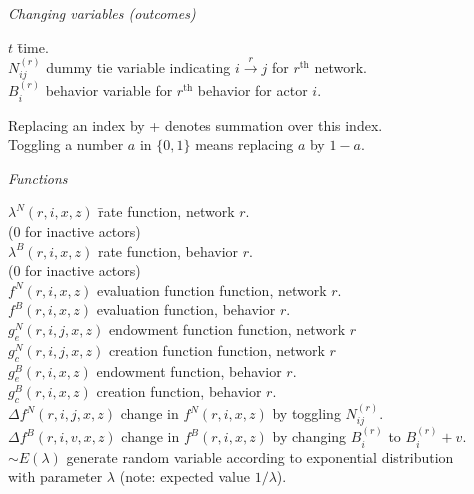 \documentclass[a4paper,12pt,fleqn]{article}
\begin{document}
\emph{Changing variables (outcomes)}

\begin{tabbing}
$t$ \hspace*{3em} \= time.\\[1ex]
$N^{(r)}_{ij}$ \> dummy tie variable indicating $ i \stackrel{r}{\rightarrow} j $ for $r^{\text{th}}$ network.\\[1ex]
$B^{(r)}_{i}$ \> behavior variable for $r^{\text{th}}$ behavior for actor $i$.
\end{tabbing}
\medskip

Replacing an index by + denotes summation over this index.\\
Toggling a number $a$ in $\{0, 1\}$ means replacing $a$ by $1-a$.
\medskip
\fi

\emph{Functions}

\begin{tabbing}
$\lambda^N(r,i,x,z)$ \hspace*{3em} \= rate function, network $r$.\\
                                  \> (0 for inactive actors)\\[1ex]
$\lambda^B(r,i,x,z)$ \hspace*{3em} \> rate function, behavior $r$.\\
                                  \> (0 for inactive actors)\\[1ex]
$f^N(r,i,x,z)$ \hspace*{3em} \> evaluation function function, network $r$.\\[1ex]
$f^B(r,i,x,z)$ \hspace*{3em} \> evaluation function, behavior $r$.\\[1ex]
$g_e^N(r,i,j,x,z)$ \hspace*{3em} \> endowment function function, network $r$\\[1ex]
$g_c^N(r,i,j,x,z)$ \hspace*{3em} \> creation function function, network $r$\\[1ex]
$g_e^B(r,i,x,z)$ \hspace*{3em} \> endowment function, behavior $r$.\\[1ex]
$g_c^B(r,i,x,z)$ \hspace*{3em} \> creation function, behavior $r$.\\[1ex]
$\Delta f^N(r,i,j,x,z)$ \hspace*{3em} \> change in $f^N(r,i,x,z)$
                                by toggling $N^{(r)}_{ij}$.\\[1ex]
$\Delta f^B(r,i,v,x,z)$ \hspace*{3em} \> change in $f^B(r,i,x,z)$
                                by changing $B^{(r)}_i$ to $B^{(r)}_i + v$.\\[1ex]
$ \sim E(\lambda)$ \> generate random variable according to exponential distribution\\
                   \> with parameter $\lambda$ (note: expected value $1/\lambda$).\\[1em]
\end{tabbing}
\end{document}

